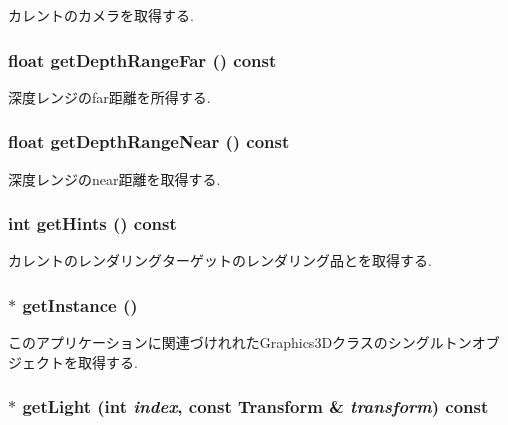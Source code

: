 カレントのカメラを取得する. \hypertarget{classm3g_1_1Graphics3D_c8c185b99073215202d2e35723f5c470}{
\subsubsection[{getDepthRangeFar}]{\setlength{\rightskip}{0pt plus 5cm}float getDepthRangeFar () const}}
\label{classm3g_1_1Graphics3D_c8c185b99073215202d2e35723f5c470}


深度レンジのfar距離を所得する. \hypertarget{classm3g_1_1Graphics3D_60bc116f673bf2782de2df3eebfb2c92}{
\subsubsection[{getDepthRangeNear}]{\setlength{\rightskip}{0pt plus 5cm}float getDepthRangeNear () const}}
\label{classm3g_1_1Graphics3D_60bc116f673bf2782de2df3eebfb2c92}


深度レンジのnear距離を取得する. \hypertarget{classm3g_1_1Graphics3D_5837234a23dc5f46d3adec17f521b58e}{
\subsubsection[{getHints}]{\setlength{\rightskip}{0pt plus 5cm}int getHints () const}}
\label{classm3g_1_1Graphics3D_5837234a23dc5f46d3adec17f521b58e}


カレントのレンダリングターゲットのレンダリング品とを取得する. \hypertarget{classm3g_1_1Graphics3D_da6d71754bfe755dd8204a9332e9ed47}{
\subsubsection[{getInstance}]{ $\ast$ getInstance ()}}
\label{classm3g_1_1Graphics3D_da6d71754bfe755dd8204a9332e9ed47}


このアプリケーションに関連づけれれたGraphics3Dクラスのシングルトンオブジェクトを取得する. \hypertarget{classm3g_1_1Graphics3D_04272e584440c89fb4cb449003a84e7d}{
\subsubsection[{getLight}]{ $\ast$ getLight (int {\em index}, \/  const {\bf Transform} \& {\em transform}) const}}
\label{classm3g_1_1Graphics3D_04272e584440c89fb4cb449003a84e7d}


